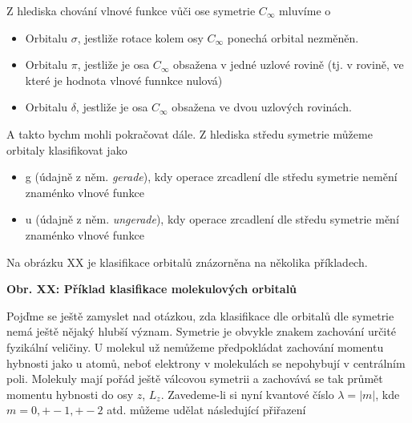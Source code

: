 Z hlediska chování vlnové funkce vůči ose symetrie $C_\infty$ mluvíme o 

\begin{itemize}

\item Orbitalu $\sigma$, jestliže rotace kolem osy $C_\infty$ ponechá orbital nezměněn.

\item Orbitalu $\pi$, jestliže je osa $C_\infty$ obsažena v jedné uzlové rovině (tj. v rovině, ve které je hodnota vlnové funnkce nulová)

\item Orbitalu $\delta$, jestliže je osa $C_\infty$ obsažena ve dvou uzlových rovinách. 

\end{itemize}

\noindent A takto bychm mohli pokračovat dále. Z hlediska středu symetrie můžeme orbitaly klasifikovat jako 

\begin{itemize}

\item g (údajně z něm. \textit{gerade}), kdy operace zrcadlení dle středu symetrie nemění znaménko vlnové funkce

\item u  (údajně z něm. \textit{ungerade}), kdy operace zrcadlení dle středu symetrie mění znaménko vlnové funkce 

\end{itemize}

Na obrázku XX je klasifikace orbitalů znázorněna na několika příkladech.

\bigskip

\textbf{Obr. XX: Příklad klasifikace molekulových orbitalů}

\bigskip
 

Pojďme se ještě zamyslet nad otázkou, zda klasifikace dle orbitalů dle symetrie nemá ještě nějaký hlubší význam. Symetrie je obvykle znakem zachování určité fyzikální veličiny. U molekul už nemůžeme předpokládat zachování momentu hybnosti jako u atomů, neboť elektrony v molekulách se nepohybují v centrálním poli. Molekuly mají pořád ještě válcovou symetrii a zachovává se tak průmět momentu hybnosti do osy $z$, $L_z$. Zavedeme-li si nyní kvantové číslo $\lambda= |m|$, kde $m=0,+-1,+-2$ atd. můžeme udělat následující přiřazení


\begin{equation}
\label{rov:XXX}
\end{equation}


